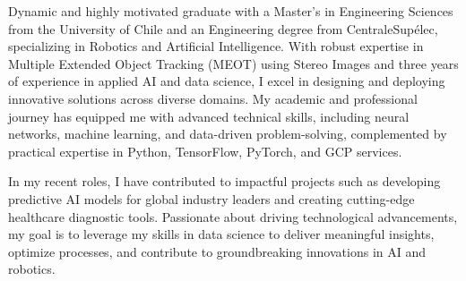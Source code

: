

Dynamic and highly motivated graduate with a Master’s in Engineering Sciences from the University of Chile and an Engineering degree from CentraleSupélec, specializing in Robotics and Artificial Intelligence. With robust expertise in Multiple Extended Object Tracking (MEOT) using Stereo Images and three years of experience in applied AI and data science, I excel in designing and deploying innovative solutions across diverse domains. My academic and professional journey has equipped me with advanced technical skills, including neural networks, machine learning, and data-driven problem-solving, complemented by practical expertise in Python, TensorFlow, PyTorch, and GCP services.

In my recent roles, I have contributed to impactful projects such as developing predictive AI models for global industry leaders and creating cutting-edge healthcare diagnostic tools. Passionate about driving technological advancements, my goal is to leverage my skills in data science to deliver meaningful insights, optimize processes, and contribute to groundbreaking innovations in AI and robotics.